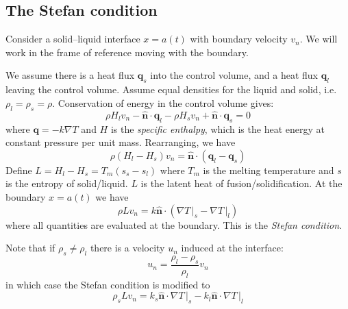 \documentclass{jknotes}
\begin{document}
\subsection{The Stefan condition}
Consider a solid--liquid interface $x = a(t)$ with boundary velocity $v_n$. We
will work in the frame of reference moving with the boundary.
\begin{center}
\end{center}

We assume there is a heat flux $\symbf{q}_s$ into the control volume, and a
heat flux $\symbf{q}_l$ leaving the control volume. Assume equal densities for
the liquid and solid, i.e. $\rho_l = \rho_s = \rho$. Conservation of energy in
the control volume gives:
\begin{equation}
	\rho H_l v_n - \hat{\symbf{n}}\cdot\symbf{q}_l - \rho H_s v_n +
	\hat{\symbf{n}} \cdot \symbf{q}_s = 0
\end{equation}
where $\symbf{q} = - k \nabla T$ and $H$ is the \emph{specific enthalpy},
which is the heat energy at constant pressure per unit mass. Rearranging, we
have
\begin{equation}
	\rho (H_l - H_s)v_n = \hat{\symbf{n}}\cdot (\symbf{q}_l - \symbf{q}_s)
\end{equation}
Define $L = H_l - H_s = T_m (s_s - s_l)$ where $T_m$ is the melting
temperature and $s$ is the entropy of solid/liquid. $L$ is the latent heat of
fusion/solidification. At the boundary $x=a(t)$ we have
\begin{equation}
	\rho L v_n = k \hat{\symbf{n}} \cdot (\left.\nabla T \,\right|_s -
	\left.\nabla T \,\right|_l)
\end{equation}
where all quantities are evaluated at the boundary. This is the \emph{Stefan
condition}.

Note that if $\rho_s \ne \rho_l$ there is a velocity $u_n$ induced at the
interface:
\begin{equation}
	u_n = \frac{\rho_l - \rho_s}{\rho_l} v_n
\end{equation}
in which case the Stefan condition is modified to
\begin{equation}
	\rho_s L v_n = k_s \hat{\symbf{n}} \cdot \left.\nabla T \,\right|_s - k_l
	\hat{\symbf{n}} \cdot \left.\nabla T \,\right|_l
\end{equation}
\end{document}

